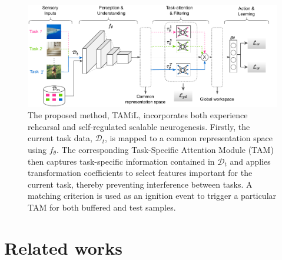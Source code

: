 \documentclass{article} %
\begin{document}
\begin{figure}[t]
  \centering
  \includegraphics[width=.95\linewidth]{images/main.pdf}
  \caption{The proposed method, TAMiL, incorporates both experience rehearsal and self-regulated scalable neurogenesis. Firstly, the current task data, $\mathcal{D}_t$, is mapped to a common representation space using $f_\theta$. The corresponding Task-Specific Attention Module (TAM) then captures task-specific information contained in $\mathcal{D}_t$ and applies transformation coefficients to select features important for the current task, thereby preventing interference between tasks. A matching criterion is used as an ignition event to trigger a particular TAM for both buffered and test samples.}
  \label{fig:main}
\end{figure}


\section{Related works}
\end{document}
